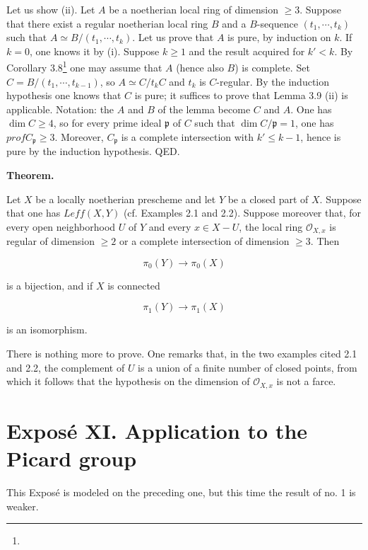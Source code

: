\documentclass[
]{article}
\begin{document}
Let us show (ii). Let \(A\) be a noetherian local ring of dimension
\(\geqslant 3\). Suppose that there exist a regular noetherian local
ring \(B\) and a \(B\)-sequence \((t_{1}, \cdots, t_{k})\) such that
\(A \simeq B/(t_{1}, \cdots, t_{k})\). Let us prove that \(A\) is pure,
by induction on \(k\). If \(k = 0\), one knows it by (i). Suppose
\(k \geqslant 1\) and the result acquired for \(k' < k\). By Corollary
3.8\footnote{} one may assume that \(A\) (hence also \(B\)) is complete.
Set \(C = B/(t_{1}, \cdots, t_{k-1})\), so \(A \simeq C/t_{k} C\) and
\(t_{k}\) is \(C\)-regular. By the induction hypothesis one knows that
\(C\) is pure; it suffices to prove that Lemma 3.9 (ii) is applicable.
Notation: the \(A\) and \(B\) of the lemma become \(C\) and \(A\). One
has \(\dim C \geqslant 4\), so for every prime ideal \(\mathfrak{p}\) of
\(C\) such that \(\dim C/\mathfrak{p} = 1\), one has
\(prof C_{\mathfrak{p}} \geqslant 3\). Moreover, \(C_{\mathfrak{p}}\) is
a complete intersection with \(k' \leqslant k - 1\), hence is pure by
the induction hypothesis. QED.

\textbf{Theorem.}

Let \(X\) be a locally noetherian prescheme and let \(Y\) be a closed
part of \(X\). Suppose that one has \(Leff(X, Y)\) (cf. Examples 2.1 and
2.2). Suppose moreover that, for every open neighborhood \(U\) of \(Y\)
and every \(x \in X - U\), the local ring \(\mathcal{O}_{X,x}\) is
regular of dimension \(\geqslant 2\) or a complete intersection of
dimension \(\geqslant 3\). Then

\[
\pi_{0}(Y) \longrightarrow \pi_{0}(X)
\]

is a bijection, and if \(X\) is connected

\[
\pi_{1}(Y) \longrightarrow \pi_{1}(X)
\]

is an isomorphism.

There is nothing more to prove. One remarks that, in the two examples
cited 2.1 and 2.2, the complement of \(U\) is a union of a finite number
of closed points, from which it follows that the hypothesis on the
dimension of \(\mathcal{O}_{X,x}\) is not a farce.

\section{Exposé XI. Application to the Picard
group}\label{exposuxe9-xi.-application-to-the-picard-group}

This Exposé is modeled on the preceding one, but this time the result of
no. 1 is weaker.
\end{document}
